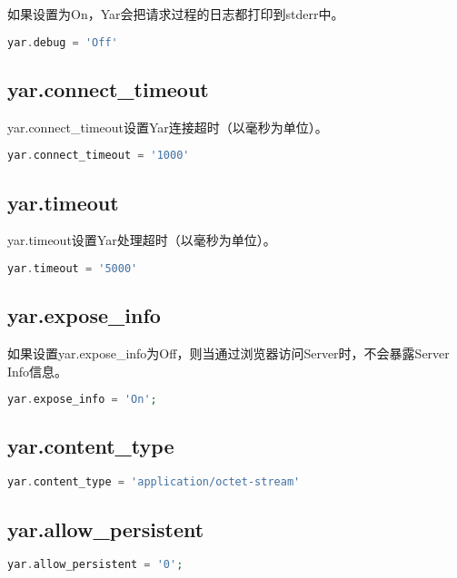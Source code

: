 如果设置为On，Yar会把请求过程的日志都打印到stderr中。

\begin{lstlisting}[language=PHP]
yar.debug = 'Off'
\end{lstlisting}

\subsection{yar.connect\_timeout}

yar.connect\_timeout设置Yar连接超时（以毫秒为单位）。

\begin{lstlisting}[language=PHP]
yar.connect_timeout = '1000'
\end{lstlisting}

\subsection{yar.timeout}

yar.timeout设置Yar处理超时（以毫秒为单位）。

\begin{lstlisting}[language=PHP]
yar.timeout = '5000'
\end{lstlisting}

\subsection{yar.expose\_info}

如果设置yar.expose\_info为Off，则当通过浏览器访问Server时，不会暴露Server Info信息。

\begin{lstlisting}[language=PHP]
yar.expose_info = 'On';
\end{lstlisting}

\subsection{yar.content\_type}


\begin{lstlisting}[language=PHP]
yar.content_type = 'application/octet-stream'
\end{lstlisting}

\subsection{yar.allow_persistent}

\begin{lstlisting}[language=PHP]
yar.allow_persistent = '0';
\end{lstlisting}


